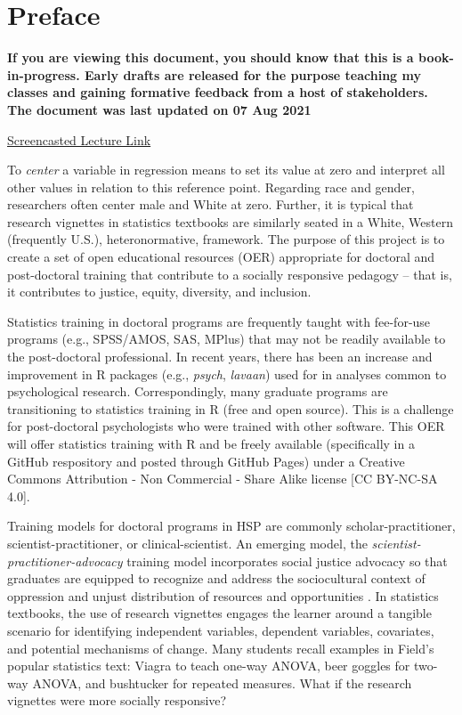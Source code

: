 \documentclass[
  english,
]{book}
\begin{document}
\hypertarget{preface}{%
\chapter*{Preface}\label{preface}}

\textbf{If you are viewing this document, you should know that this is a book-in-progress. Early drafts are released for the purpose teaching my classes and gaining formative feedback from a host of stakeholders. The document was last updated on 07 Aug 2021}

\href{https://spu.hosted.panopto.com/Panopto/Pages/Viewer.aspx?id=c932455e-ef06-444a-bdca-acf7012d759a}{Screencasted Lecture Link}

To \emph{center} a variable in regression means to set its value at zero and interpret all other values in relation to this reference point. Regarding race and gender, researchers often center male and White at zero. Further, it is typical that research vignettes in statistics textbooks are similarly seated in a White, Western (frequently U.S.), heteronormative, framework. The purpose of this project is to create a set of open educational resources (OER) appropriate for doctoral and post-doctoral training that contribute to a socially responsive pedagogy -- that is, it contributes to justice, equity, diversity, and inclusion.

Statistics training in doctoral programs are frequently taught with fee-for-use programs (e.g., SPSS/AMOS, SAS, MPlus) that may not be readily available to the post-doctoral professional. In recent years, there has been an increase and improvement in R packages (e.g., \emph{psych}, \emph{lavaan}) used for in analyses common to psychological research. Correspondingly, many graduate programs are transitioning to statistics training in R (free and open source). This is a challenge for post-doctoral psychologists who were trained with other software. This OER will offer statistics training with R and be freely available (specifically in a GitHub respository and posted through GitHub Pages) under a Creative Commons Attribution - Non Commercial - Share Alike license {[}CC BY-NC-SA 4.0{]}.

Training models for doctoral programs in HSP are commonly scholar-practitioner, scientist-practitioner, or clinical-scientist. An emerging model, the \emph{scientist-practitioner-advocacy} training model incorporates social justice advocacy so that graduates are equipped to recognize and address the sociocultural context of oppression and unjust distribution of resources and opportunities \citep{mallinckrodt_scientist-practitioner-advocate_2014}. In statistics textbooks, the use of research vignettes engages the learner around a tangible scenario for identifying independent variables, dependent variables, covariates, and potential mechanisms of change. Many students recall examples in Field's \citeyearpar{field_discovering_2012} popular statistics text: Viagra to teach one-way ANOVA, beer goggles for two-way ANOVA, and bushtucker for repeated measures. What if the research vignettes were more socially responsive?
\end{document}
